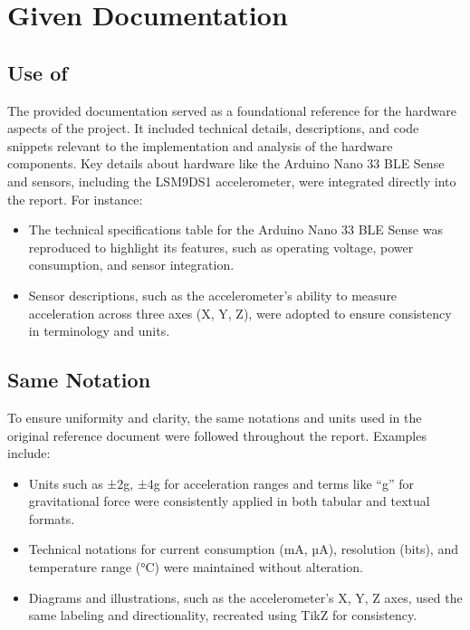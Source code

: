 %
%
%
%

\section{Given Documentation}

\subsection{Use of}
The provided documentation served as a foundational reference for the hardware aspects of the project. It included technical details, descriptions, and code snippets relevant to the implementation and analysis of the hardware components. Key details about hardware like the Arduino Nano 33 BLE Sense and sensors, including the LSM9DS1 accelerometer, were integrated directly into the report. For instance:
\begin{itemize}
	\item The technical specifications table for the Arduino Nano 33 BLE Sense was reproduced to highlight its features, such as operating voltage, power consumption, and sensor integration.
	\item Sensor descriptions, such as the accelerometer's ability to measure acceleration across three axes (X, Y, Z), were adopted to ensure consistency in terminology and units.
\end{itemize}

\subsection{Same Notation}
To ensure uniformity and clarity, the same notations and units used in the original reference document were followed throughout the report. Examples include:
\begin{itemize}
	\item Units such as ±2g, ±4g for acceleration ranges and terms like “g” for gravitational force were consistently applied in both tabular and textual formats.
	\item Technical notations for current consumption (mA, µA), resolution (bits), and temperature range (°C) were maintained without alteration.
	\item Diagrams and illustrations, such as the accelerometer’s X, Y, Z axes, used the same labeling and directionality, recreated using TikZ for consistency.
\end{itemize}

